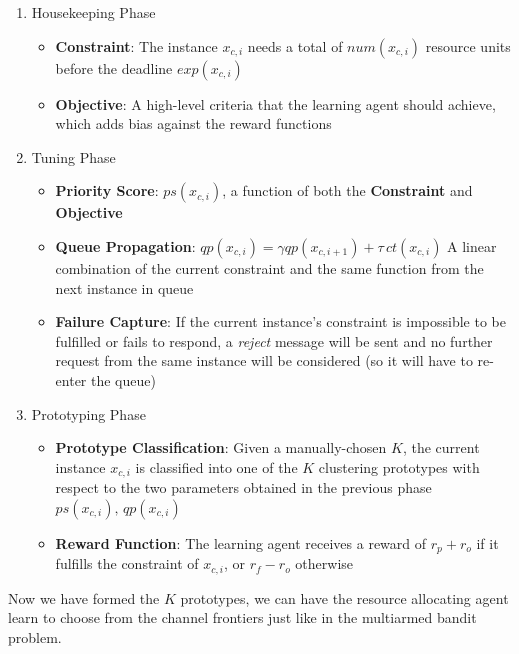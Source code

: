 \documentclass[conference]{IEEEtran}
\begin{document}
\begin{enumerate}
	\item Housekeeping Phase
	\begin{itemize}
		\item \textbf{Constraint}: The instance $x_{c,i}$ needs a total of $num(x_{c,i})$ resource units before the deadline $exp(x_{c,i})$
		\item \textbf{Objective}: A high-level criteria that the learning agent should achieve, which adds bias against the reward functions
	\end{itemize}
	\item Tuning Phase
	\begin{itemize}
		\item \textbf{Priority Score}: $ps(x_{c,i})$, a function of both the \textbf{Constraint} and \textbf{Objective}
		\item \textbf{Queue Propagation}: $qp(x_{c,i}) = \gamma qp(x_{c,i+1}) + \tau \,ct(x_{c,i})$ A linear combination of the current constraint and the same function from the next instance in queue
		\item \textbf{Failure Capture}: If the current instance's constraint is impossible to be fulfilled or fails to respond, a \emph{reject} message will be sent and no further request from the same instance will be considered (so it will have to re-enter the queue)
	\end{itemize}
	\item Prototyping Phase
	\begin{itemize}
		\item \textbf{Prototype Classification}: Given a manually-chosen $K$, the current instance $x_{c,i}$ is classified into one of the $K$ clustering prototypes with respect to the two parameters obtained in the previous phase $ps(x_{c,i}),\, qp(x_{c,i})$
		\item \textbf{Reward Function}: The learning agent receives a reward of $r_p+r_o$ if it fulfills the constraint of $x_{c,i}$, or $r_f-r_o$ otherwise
	\end{itemize}
\end{enumerate}

Now we have formed the $K$ prototypes, we can have the resource allocating agent learn to choose from the channel frontiers just like in the multiarmed bandit problem.

\newpage

%
%
%
%
%
\end{document}
